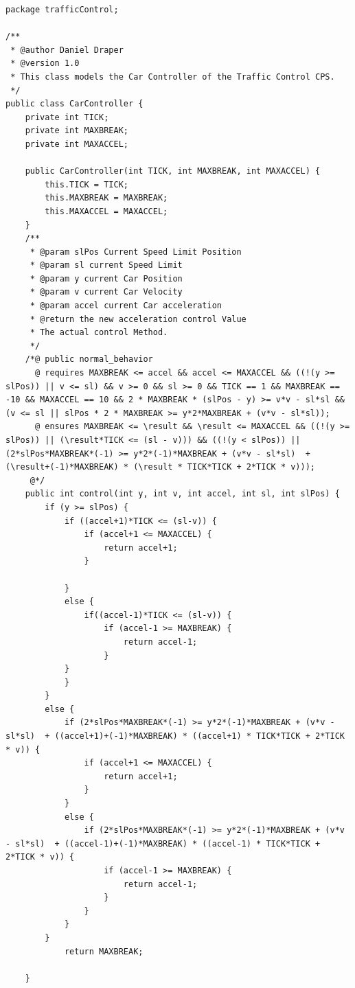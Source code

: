 \begin{lstlisting}[label=app:lst:carContr]
package trafficControl;

/**
 * @author Daniel Draper
 * @version 1.0
 * This class models the Car Controller of the Traffic Control CPS.
 */
public class CarController {
	private int TICK;
	private int MAXBREAK;
	private int MAXACCEL;

	public CarController(int TICK, int MAXBREAK, int MAXACCEL) {
		this.TICK = TICK;
		this.MAXBREAK = MAXBREAK;
		this.MAXACCEL = MAXACCEL;
	}
	/**
	 * @param slPos Current Speed Limit Position
	 * @param sl current Speed Limit
	 * @param y current Car Position 
	 * @param v current Car Velocity
	 * @param accel current Car acceleration
	 * @return the new acceleration control Value
	 * The actual control Method.
	 */
	/*@ public normal_behavior
	  @ requires MAXBREAK <= accel && accel <= MAXACCEL && ((!(y >= slPos)) || v <= sl) && v >= 0 && sl >= 0 && TICK == 1 && MAXBREAK == -10 && MAXACCEL == 10 && 2 * MAXBREAK * (slPos - y) >= v*v - sl*sl && (v <= sl || slPos * 2 * MAXBREAK >= y*2*MAXBREAK + (v*v - sl*sl));
	  @ ensures MAXBREAK <= \result && \result <= MAXACCEL && ((!(y >= slPos)) || (\result*TICK <= (sl - v))) && ((!(y < slPos)) || (2*slPos*MAXBREAK*(-1) >= y*2*(-1)*MAXBREAK + (v*v - sl*sl)  + (\result+(-1)*MAXBREAK) * (\result * TICK*TICK + 2*TICK * v)));
	 @*/
	public int control(int y, int v, int accel, int sl, int slPos) {
		if (y >= slPos) {
			if ((accel+1)*TICK <= (sl-v)) {
				if (accel+1 <= MAXACCEL) {
					return accel+1;
				}
				
			}
			else {
				if((accel-1)*TICK <= (sl-v)) {
					if (accel-1 >= MAXBREAK) {
						return accel-1;
					}
			}
			}
		}
		else {
			if (2*slPos*MAXBREAK*(-1) >= y*2*(-1)*MAXBREAK + (v*v - sl*sl)  + ((accel+1)+(-1)*MAXBREAK) * ((accel+1) * TICK*TICK + 2*TICK * v)) {
				if (accel+1 <= MAXACCEL) {
					return accel+1;
				}
			}
			else {
				if (2*slPos*MAXBREAK*(-1) >= y*2*(-1)*MAXBREAK + (v*v - sl*sl)  + ((accel-1)+(-1)*MAXBREAK) * ((accel-1) * TICK*TICK + 2*TICK * v)) {
					if (accel-1 >= MAXBREAK) {
						return accel-1;
					}
				}
			}
		}
			return MAXBREAK;
		
	}
\end{lstlisting}

